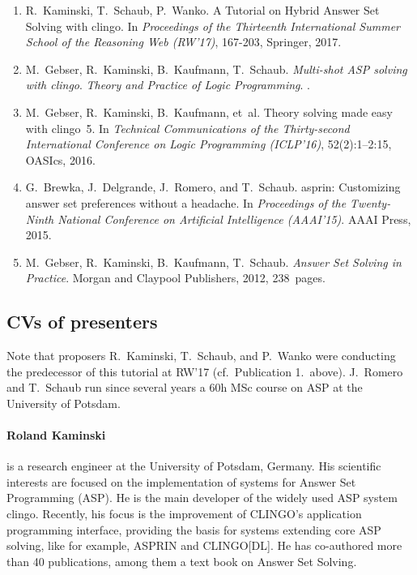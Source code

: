 \documentclass{article}
\begin{document}
\begin{enumerate}
\item%
  R.~Kaminski, T.~Schaub, P.~Wanko.
  A Tutorial on Hybrid Answer Set Solving with clingo.
  In {\em Proceedings of the Thirteenth International Summer School of the Reasoning Web (RW'17)},
  167-203, Springer, 2017.

\item%
  M.~Gebser, R.~Kaminski, B.~Kaufmann, T.~Schaub.
  \emph{Multi-shot {ASP} solving with clingo}.
  \emph{Theory and Practice of Logic Programming}.
  .

\item %
  M.~Gebser, R.~Kaminski, B.~Kaufmann, et~al.
  Theory solving made easy with clingo~5.
  In {\em Technical Communications of the Thirty-second International Conference on Logic Programming (ICLP'16)},
  52(2):1--2:15, OASIcs, 2016.

\item%
  G.~Brewka, J.~Delgrande, J.~Romero, and T.~Schaub.
  asprin: Customizing answer set preferences without a headache.
  In {\em Proceedings of the Twenty-Ninth National Conference on Artificial Intelligence (AAAI'15)}.
  AAAI Press, 2015.

\item%
  M.~Gebser, R.~Kaminski, B.~Kaufmann, T.~Schaub.
  \emph{Answer Set Solving in Practice}.
  Morgan and Claypool Publishers, 2012, 238~pages.

\end{enumerate}

\newpage
\subsection*{CVs of presenters}

Note that proposers R.~Kaminski, T.~Schaub, and P.~Wanko were conducting the predecessor of this tutorial at RW'17
(cf.\ Publication 1.\ above).
J.~Romero and T.~Schaub run since several years a 60h MSc course on ASP at the University of Potsdam.

\paragraph{Roland Kaminski}
%
is a research engineer at the University of Potsdam, Germany.
%
His scientific interests are focused on the implementation of systems for Answer Set Programming (ASP).
%
He is the main developer of the widely used ASP system clingo.
Recently, his focus is the improvement of CLINGO's application programming interface,
providing the basis for systems extending core ASP solving, like for example, ASPRIN and CLINGO[DL].
%
He has co-authored more than 40 publications, among them a text book on Answer Set Solving.
\end{document}
